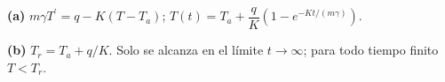 \noindent\textbf{(a)} $m\gamma T^{\prime}=q-K(T-T_a)$; $T(t)=T_a+\dfrac qK(1-e^{-Kt/(m\gamma)})$.

\noindent\textbf{(b)} $T_r=T_a+q/K$. Solo se alcanza en el límite $t\to\infty$; para todo tiempo finito $T<T_r$.

